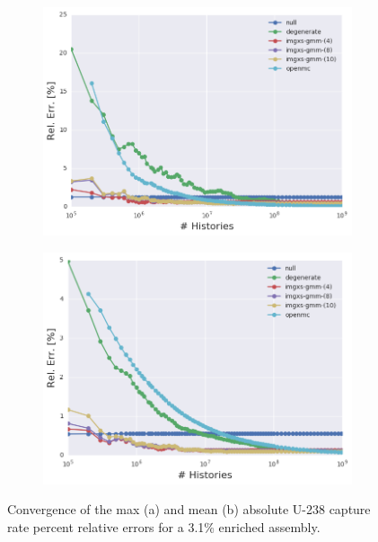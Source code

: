 \clearpage

\begin{figure}[h!]
\centering
\begin{subfigure}{\textwidth}
  \centering
  \includegraphics[width=0.9\linewidth]{figures/results/convergence/assm-31/max-capt-err-evo}
  \caption{}
  \label{fig:chap11-assm-3.1-capture-converge-max}
\end{subfigure}
\begin{subfigure}{\textwidth}
  \centering
  \includegraphics[width=0.9\linewidth]{figures/results/convergence/assm-31/mean-capt-err-evo}
  \caption{}
  \label{fig:chap11-assm-3.1-capture-converge-mean}
\end{subfigure}
\vspace{2mm}
\caption[Fission rate covergence for a 3.1\% enriched assembly]{Convergence of the max (a) and mean (b) absolute U-238 capture rate percent relative errors for a 3.1\% enriched assembly.}
\label{fig:chap11-assm-3.1-capture-converge}
\end{figure}

